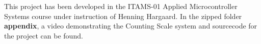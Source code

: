 This project has been developed in the ITAMS-01 Applied Microcontroller Systems course
under instruction of Henning Hargaard. In the zipped folder \textbf{appendix}, a video demonstrating the Counting Scale system and sourcecode for the project can be found. 
